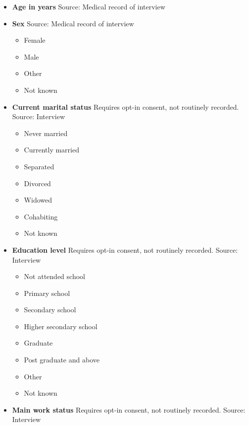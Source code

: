 \documentclass[
]{scrartcl}
\providecommand{\tightlist}{%
  \setlength{\itemsep}{0pt}\setlength{\parskip}{0pt}}\usepackage{longtable,booktabs,array}
\begin{document}
\begin{itemize}
\item
  \textbf{Age in years} Source: Medical record of interview
\item
  \textbf{Sex} Source: Medical record of interview

  \begin{itemize}
  \tightlist
  \item
    Female
  \item
    Male
  \item
    Other
  \item
    Not known
  \end{itemize}
\item
  \textbf{Current marital status} Requires opt-in consent, not routinely
  recorded. Source: Interview

  \begin{itemize}
  \tightlist
  \item
    Never married
  \item
    Currently married
  \item
    Separated
  \item
    Divorced
  \item
    Widowed
  \item
    Cohabiting
  \item
    Not known
  \end{itemize}
\item
  \textbf{Education level} Requires opt-in consent, not routinely
  recorded. Source: Interview

  \begin{itemize}
  \tightlist
  \item
    Not attended school
  \item
    Primary school
  \item
    Secondary school
  \item
    Higher secondary school
  \item
    Graduate
  \item
    Post graduate and above
  \item
    Other
  \item
    Not known
  \end{itemize}
\item
  \textbf{Main work status} Requires opt-in consent, not routinely
  recorded. Source: Interview


\end{itemize}
\end{document}
